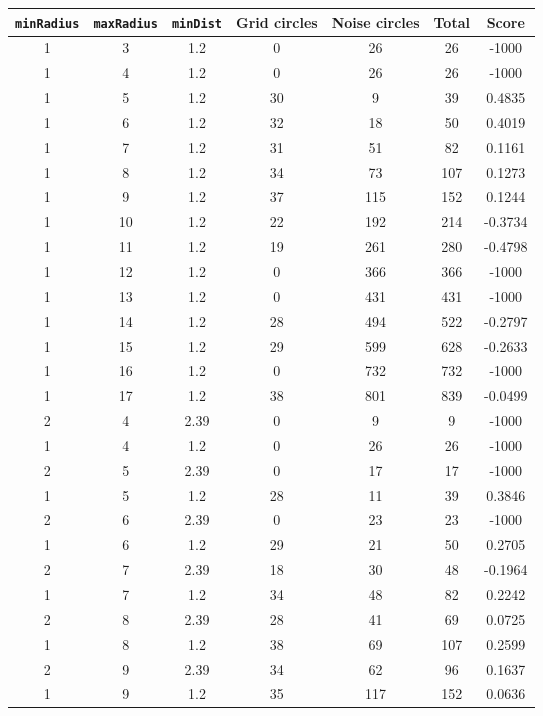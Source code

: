 \documentclass[letterpaper, 12pt]{article}
\begin{document}
\begin{longtable}{|c|c|c|c|c|c|c|}
\hline
\textbf{\texttt{minRadius}} & \textbf{\texttt{maxRadius}} & \textbf{\texttt{minDist}} & \textbf{Grid circles} & \textbf{Noise circles} & \textbf{Total} & \textbf{Score} \\
\hline
1 & 3 & 1.2 & 0 & 26 & 26 & -1000 \\
\hline
1 & 4 & 1.2 & 0 & 26 & 26 & -1000 \\
\hline
1 & 5 & 1.2 & 30 & 9 & 39 & 0.4835 \\
\hline
1 & 6 & 1.2 & 32 & 18 & 50 & 0.4019 \\
\hline
1 & 7 & 1.2 & 31 & 51 & 82 & 0.1161 \\
\hline
1 & 8 & 1.2 & 34 & 73 & 107 & 0.1273 \\
\hline
1 & 9 & 1.2 & 37 & 115 & 152 & 0.1244 \\
\hline
1 & 10 & 1.2 & 22 & 192 & 214 & -0.3734 \\
\hline
1 & 11 & 1.2 & 19 & 261 & 280 & -0.4798 \\
\hline
1 & 12 & 1.2 & 0 & 366 & 366 & -1000 \\
\hline
1 & 13 & 1.2 & 0 & 431 & 431 & -1000 \\
\hline
1 & 14 & 1.2 & 28 & 494 & 522 & -0.2797 \\
\hline
1 & 15 & 1.2 & 29 & 599 & 628 & -0.2633 \\
\hline
1 & 16 & 1.2 & 0 & 732 & 732 & -1000 \\
\hline
1 & 17 & 1.2 & 38 & 801 & 839 & -0.0499 \\
\hline
2 & 4 & 2.39 & 0 & 9 & 9 & -1000 \\
\hline
1 & 4 & 1.2 & 0 & 26 & 26 & -1000 \\
\hline
2 & 5 & 2.39 & 0 & 17 & 17 & -1000 \\
\hline
1 & 5 & 1.2 & 28 & 11 & 39 & 0.3846 \\
\hline
2 & 6 & 2.39 & 0 & 23 & 23 & -1000 \\
\hline
1 & 6 & 1.2 & 29 & 21 & 50 & 0.2705 \\
\hline
2 & 7 & 2.39 & 18 & 30 & 48 & -0.1964 \\
\hline
1 & 7 & 1.2 & 34 & 48 & 82 & 0.2242 \\
\hline
2 & 8 & 2.39 & 28 & 41 & 69 & 0.0725 \\
\hline
1 & 8 & 1.2 & 38 & 69 & 107 & 0.2599 \\
\hline
2 & 9 & 2.39 & 34 & 62 & 96 & 0.1637 \\
\hline
1 & 9 & 1.2 & 35 & 117 & 152 & 0.0636 \\

\end{longtable}
\end{document}
